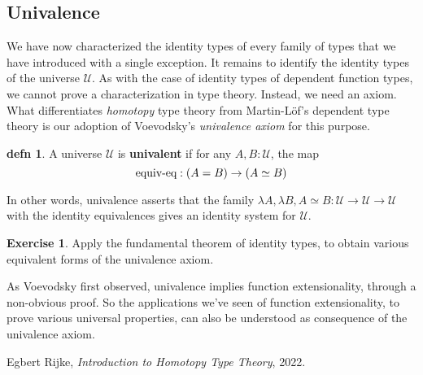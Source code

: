 \documentclass{amsart}
\theoremstyle{theorem}
\newtheorem*{thm}{Theorem}
\theoremstyle{definition}
\newtheorem*{defn}{defn}
\newtheorem*{exc}{Exercise}
\theoremstyle{remark}
\newcommand{\0}{\mathbbe{0}}
\newcommand{\1}{\mathbbe{1}}
\newcommand{\2}{\mathbbe{2}}
\newcommand{\3}{\mathbbe{3}}
\newcommand{\4}{\mathbbe{4}}
\newcommand{\term}[1]{{\textup{#1}}}
\newcommand{\bN}{{\mathbb{N}}}
\newcommand{\UU}{{\mathcal{U}}}
\begin{document}
\begin{comment}
A final application of function extensionality is to prove the strong induction principle for the natural numbers. We give the statement and leave the proof to \cite[\S13.5]{Rijke}. Function extensionality is needed to give the computation rules.

\begin{thm} Consider a type family $P$ over $\bN$ with $p_0 : P(0)$ and
\[ p_S : \prod_{n: \bN} \left( \prod_{m: \bN}(m \leq n) \to P(m)\right) \to P(n+1).\]
Then there is a dependent function
\[ \term{strong-ind}_\bN(p_0,p_S) : \prod_{n : \bN}P(n) \]
so that $\term{strong-ind}_\bN(p_0,p_S,0)  = 0$ and
\[ \term{strong-ind}_\bN(p_0,p_S, n+1) = p_S(n, \lambda m.\lambda p.\term{strong-ind}_\bN(p_0,p_s,m)).\]
\end{thm}
\end{comment}

\subsection*{Univalence}

We have now characterized the identity types of every family of types that we have introduced with a single exception. It remains to identify the identity types of the universe $\UU$. As with the case of identity types of dependent function types, we cannot prove a characterization in type theory. Instead, we need an axiom. What differentiates \emph{homotopy} type theory from Martin-L\"{o}f's dependent type theory is our adoption of Voevodsky's \emph{univalence axiom} for this purpose.

\begin{defn} A universe
$\UU$ is \textbf{univalent} if for any $A, B : \UU$, the map
\[ \term{equiv-eq} : (A = B) \to (A \simeq B)\]
\end{defn}

In other words, univalence asserts that the family $\lambda A,\lambda B, A \simeq B : \UU \to \UU \to \UU$ with the identity equivalences gives an identity system for $\UU$.

\begin{exc} Apply the fundamental theorem of identity types, to obtain various equivalent forms of the univalence axiom.
\end{exc}

As Voevodsky first observed, univalence implies function extensionality, through a non-obvious proof. So the applications we've seen of function extensionality, to prove various universal properties, can also be understood as consequence of the univalence axiom.



\begin{thebibliography}{UF}


 Egbert Rijke, \emph{Introduction to Homotopy Type Theory}, 2022.


\end{thebibliography}
\end{document}
